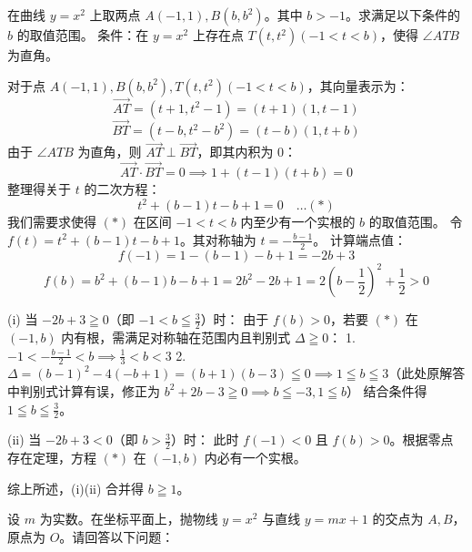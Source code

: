 \begin{questions}
    \question
在曲线 $y=x^2$ 上取两点 $A(-1, 1), B(b, b^2)$。其中 $b > -1$。求满足以下条件的 $b$ 的取值范围。
条件：在 $y=x^2$ 上存在点 $T(t, t^2) (-1 < t < b)$，使得 $\angle ATB$ 为直角。

\begin{solution}
对于点 $A(-1, 1), B(b, b^2), T(t, t^2) (-1 < t < b)$，其向量表示为：
\[ \vec{AT} = (t+1, t^2-1) = (t+1)(1, t-1) \]
\[ \vec{BT} = (t-b, t^2-b^2) = (t-b)(1, t+b) \]
由于 $\angle ATB$ 为直角，则 $\vec{AT} \perp \vec{BT}$，即其内积为 0：
\[ \vec{AT} \cdot \vec{BT} = 0 \implies 1 + (t-1)(t+b) = 0 \]
整理得关于 $t$ 的二次方程：
\[ t^2 + (b-1)t - b + 1 = 0 \quad \dots (*) \]
我们需要求使得 $(*)$ 在区间 $-1 < t < b$ 内至少有一个实根的 $b$ 的取值范围。
令 $f(t) = t^2 + (b-1)t - b + 1$。其对称轴为 $t = -\frac{b-1}{2}$。
计算端点值：
\[ f(-1) = 1 - (b-1) - b + 1 = -2b + 3 \]
\[ f(b) = b^2 + (b-1)b - b + 1 = 2b^2 - 2b + 1 = 2(b-\frac{1}{2})^2 + \frac{1}{2} > 0 \]

(i) 当 $-2b + 3 \geqq 0$（即 $-1 < b \leqq \frac{3}{2}$）时：
由于 $f(b) > 0$，若要 $(*)$ 在 $(-1, b)$ 内有根，需满足对称轴在范围内且判别式 $\Delta \geqq 0$：
1. $-1 < -\frac{b-1}{2} < b \implies \frac{1}{3} < b < 3$
2. $\Delta = (b-1)^2 - 4(-b+1) = (b+1)(b-3) \leqq 0 \implies 1 \leqq b \leqq 3$（此处原解答中判别式计算有误，修正为 $b^2+2b-3 \geqq 0 \implies b \leqq -3, 1 \leqq b$）
结合条件得 $1 \leqq b \leqq \frac{3}{2}$。

(ii) 当 $-2b + 3 < 0$（即 $b > \frac{3}{2}$）时：
此时 $f(-1) < 0$ 且 $f(b) > 0$。根据零点存在定理，方程 $(*)$ 在 $(-1, b)$ 内必有一个实根。

综上所述，(i)(ii) 合并得 $b \geqq 1$。
\end{solution}

\question
设 $m$ 为实数。在坐标平面上，抛物线 $y = x^2$ 与直线 $y = mx + 1$ 的交点为 $A, B$，原点为 $O$。请回答以下问题：
\end{questions}
